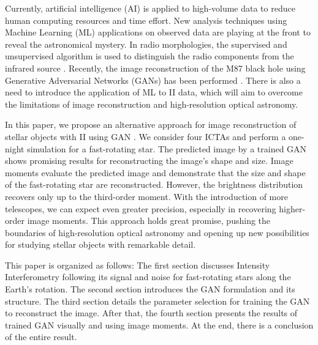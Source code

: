 Currently, artificial intelligence (AI) is applied to high-volume data to reduce human computing resources and time effort. New analysis techniques using Machine Learning (ML) applications on observed data are playing at the front to reveal the astronomical mystery. In radio morphologies, the supervised and unsupervised algorithm is used to distinguish the radio components from the infrared source \citep{wu2019radio, galvin2020cataloguing}. Recently, the image reconstruction of the M87 black hole using Generative Adversarial Networks (GANs) has been performed \citep{10.1093/mnras/stad3797}. There is also a need to introduce the application of ML to II data, which will aim to overcome the limitations of image reconstruction and high-resolution optical astronomy. 

In this paper, we propose an alternative approach for image reconstruction of stellar objects with II using GAN \citep{goodfellow2014generative}. We consider four ICTAs and perform a one-night simulation for a fast-rotating star. The predicted image by a trained GAN shows promising results for reconstructing the image's shape and size. Image moments evaluate the predicted image and demonstrate that the size and shape of the fast-rotating star are reconstructed. However, the brightness distribution recovers only up to the third-order moment. With the introduction of more telescopes, we can expect even greater precision, especially in recovering higher-order image moments. This approach holds great promise, pushing the boundaries of high-resolution optical astronomy and opening up new possibilities for studying stellar objects with remarkable detail.

This paper is organized as follows: The first section discusses Intensity Interferometry following its signal and noise for fast-rotating stars along the Earth's rotation. The second section introduces the GAN formulation and its structure. The third section details the parameter selection for training the GAN to reconstruct the image. After that, the fourth section presents the results of trained GAN visually and using image moments. At the end, there is a conclusion of the entire result.